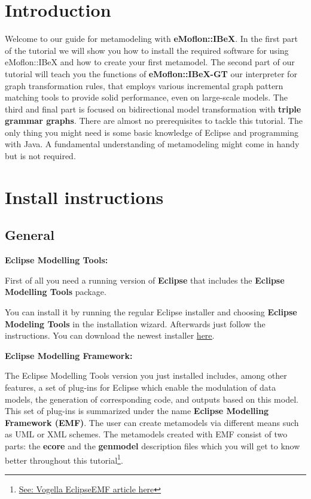 \section{Introduction}
Welcome to our guide for metamodeling with \textbf{eMoflon::IBeX}. In the first part of the tutorial we will show you how to install the required software for using eMoflon::IBeX and how to create your first metamodel.\newline
The second part of our tutorial will teach you the functions of \textbf{eMoflon::IBeX-GT} our interpreter for graph transformation rules, that employs various incremental graph pattern matching tools to provide solid performance, even on large-scale models.\newline
The third and final part is focused on bidirectional model transformation with \textbf{triple grammar graphs}.\newline
There are almost no prerequisites to tackle this tutorial. The only thing you might need is some basic knowledge of Eclipse and programming with Java. A fundamental understanding of metamodeling might come in handy but is not required. 

\section{Install instructions}

\raggedright

\subsection{General}

\textbf{Eclipse Modelling Tools:}

First of all you need a running version of \textbf{Eclipse} that includes the \textbf{Eclipse Modelling Tools} package.

You can install it by running the regular Eclipse installer and choosing \textbf{Eclipse Modeling Tools} in the installation wizard. Afterwards just follow the instructions.\newline
You can download the newest installer \underline{\href{https://www.eclipse.org/downloads/}{here}}.\newline

\textbf{Eclipse Modelling Framework:}

The Eclipse Modelling Tools version you just installed includes, among other features, a set of plug-ins for Eclipse which enable the modulation of data models, the generation of corresponding code, and outputs based on this model.\newline
This set of plug-ins is summarized under the name \textbf{Eclipse Modelling Framework (EMF)}.\newline
The user can create metamodels via different means such as UML or XML schemes. The metamodels created with EMF consist of two parts: the \textbf{ecore} and the \textbf{genmodel} description files which you will get to know better throughout this tutorial\footnote{\href{https://www.vogella.com/tutorials/EclipseEMF/article.html}{See: Vogella EclipseEMF article \underline{here}}}.

